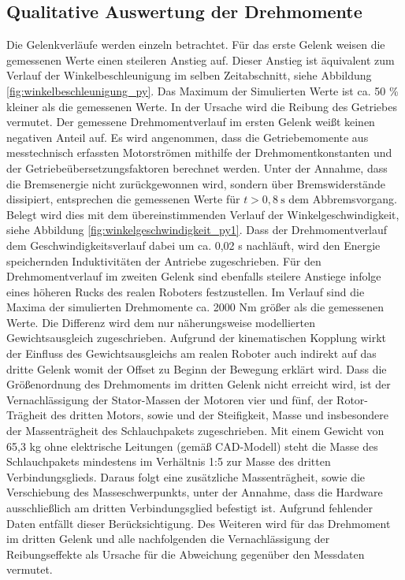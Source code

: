 \subsection*{Qualitative Auswertung der Drehmomente}
Die Gelenkverläufe werden einzeln betrachtet. Für das erste Gelenk weisen die gemessenen Werte einen steileren Anstieg auf. Dieser Anstieg ist äquivalent zum Verlauf der Winkelbeschleunigung im selben Zeitabschnitt, siehe Abbildung \ref{fig:winkelbeschleunigung_py}. Das Maximum der Simulierten Werte ist ca. 50 \% kleiner als die gemessenen Werte. In der Ursache wird die Reibung des Getriebes vermutet. Der gemessene Drehmomentverlauf im ersten Gelenk weißt keinen negativen Anteil auf. Es wird angenommen, dass die Getriebemomente aus messtechnisch erfassten Motorströmen mithilfe der Drehmomentkonstanten und der Getriebeübersetzungsfaktoren berechnet werden. Unter der Annahme, dass die Bremsenergie nicht zurückgewonnen wird, sondern über Bremswiderstände dissipiert, entsprechen die gemessenen Werte für $t>0,8~\text{s}$ dem  Abbremsvorgang. Belegt wird dies mit dem übereinstimmenden Verlauf der Winkelgeschwindigkeit, siehe Abbildung \ref{fig:winkelgeschwindigkeit_py1}. Dass der Drehmomentverlauf dem Geschwindigkeitsverlauf dabei um ca. 0,02 s nachläuft, wird den Energie speichernden Induktivitäten der Antriebe zugeschrieben. Für den Drehmomentverlauf im zweiten Gelenk sind ebenfalls steilere Anstiege infolge eines höheren Rucks des realen Roboters festzustellen. Im Verlauf sind die Maxima der simulierten Drehmomente  ca. 2000 Nm größer als die gemessenen Werte. Die Differenz wird dem nur näherungsweise modellierten Gewichtsausgleich zugeschrieben. Aufgrund der kinematischen Kopplung wirkt der Einfluss des Gewichtsausgleichs am realen Roboter auch indirekt auf das dritte Gelenk womit der Offset zu Beginn der Bewegung erklärt wird. Dass die Größenordnung des Drehmoments im dritten Gelenk nicht erreicht wird, ist der Vernachlässigung der Stator-Massen der Motoren vier und fünf, der Rotor-Trägheit des dritten Motors, sowie und der Steifigkeit, Masse und insbesondere der Massenträgheit des Schlauchpakets zugeschrieben. Mit einem Gewicht von 65,3 kg  ohne elektrische Leitungen (gemäß CAD-Modell) steht die Masse des Schlauchpakets mindestens im Verhältnis 1:5 zur Masse des dritten Verbindungsglieds. Daraus folgt eine zusätzliche Massenträgheit, sowie die Verschiebung des Masseschwerpunkts, unter der Annahme, dass die Hardware ausschließlich am dritten Verbindungsglied befestigt ist. Aufgrund fehlender Daten entfällt dieser Berücksichtigung. Des Weiteren wird für das Drehmoment im dritten Gelenk und alle nachfolgenden die Vernachlässigung  der Reibungseffekte als Ursache für die Abweichung gegenüber den Messdaten vermutet. 
%
